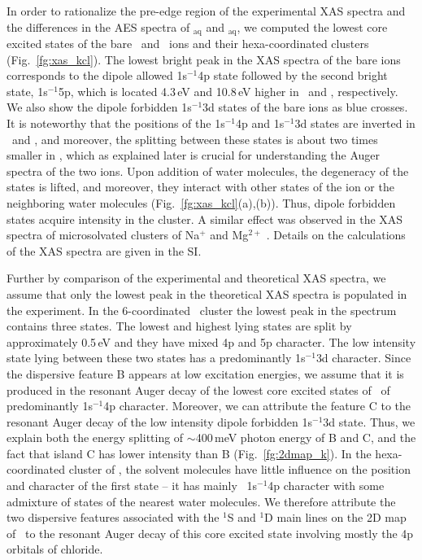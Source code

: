 In order to rationalize the pre-edge region of the experimental XAS spectra and the differences in the AES spectra of \ki$_{\text{aq}}$ and \cli$_{\text{aq}}$, we computed the lowest core excited states of the bare \ki~and \cli~ions and their hexa-coordinated clusters (Fig.\ \ref{fg:xas_kcl}). The lowest bright peak in the XAS spectra of the bare ions corresponds to the dipole allowed 1s$^{-1}$4p state followed by the second bright state, 1s$^{-1}$5p, which is located 4.3\,eV and 10.8\,eV higher in \ki~and \cli, respectively. We also show the dipole forbidden 1s$^{-1}$3d states of the bare ions as blue crosses. It is noteworthy that the positions of the 1s$^{-1}$4p and 1s$^{-1}$3d states are inverted in \ki~and \cli, and moreover, the splitting between these states is about two times smaller in \ki, which as explained later is crucial for understanding the Auger spectra of the two ions. Upon addition of water molecules, the degeneracy of the states is lifted, and moreover, they interact with other states of the ion or the neighboring water molecules (Fig.\ \ref{fg:xas_kcl}(a),(b)). Thus, dipole forbidden states acquire intensity in the cluster. A similar effect was observed in the XAS spectra of microsolvated clusters of Na$^{+}$ and Mg$^{2+}$ \citep{miteva16:16671}. Details on the calculations of the XAS spectra are given in the SI.


Further by comparison of the experimental and theoretical XAS spectra, we assume that only the lowest peak in the theoretical XAS spectra is populated in the experiment. In the 6-coordinated \ki~cluster the lowest peak in the spectrum contains three states. The lowest and highest lying states are split by approximately 0.5\,eV and they have mixed 4p and 5p character. The low intensity state lying between these two states has a predominantly 1s$^{-1}$3d character. Since the dispersive feature B appears at low excitation energies, we assume that it is produced in the resonant Auger decay of the lowest core excited states of \ki~of predominantly 1s$^{-1}$4p character. Moreover, we can attribute the feature C to the resonant Auger decay of the low intensity dipole forbidden 1s$^{-1}$3d state. Thus, we explain both the energy splitting of $\sim$400\,meV photon energy of B and C, and the fact that island C has lower intensity than B (Fig.\ \ref{fg:2dmap_k}). In the hexa-coordinated cluster of \cli, the solvent molecules have little influence on the position and character of the first state -- it has mainly \cli~1s$^{-1}$4p character with some admixture of states of the nearest water molecules. We therefore attribute the two dispersive features associated with the $^1$S and $^1$D main lines on the 2D map of \cli~to the resonant Auger decay of this core excited state involving mostly the 4p orbitals of chloride.



